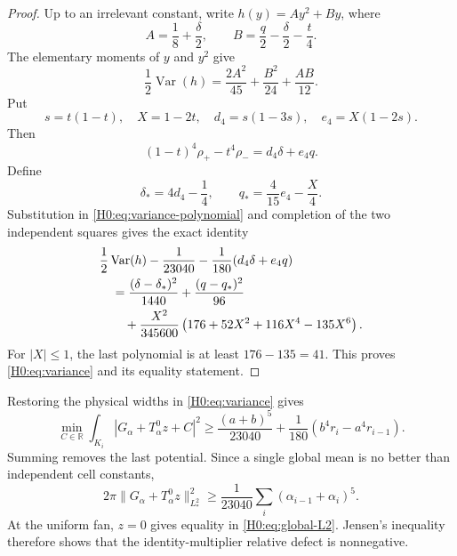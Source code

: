 \documentclass[11pt]{amsart}
\numberwithin{equation}{section}
\theoremstyle{definition}
\theoremstyle{remark}
\newcommand{\R}{\mathbb R}
\begin{document}
\begin{proof}
Up to an irrelevant constant, write $h(y)=Ay^2+By$, where
\begin{equation}
 A=\frac18+\frac\delta2,
 \qquad B=\frac q2-\frac\delta2-\frac t4.
\end{equation}
The elementary moments of $y$ and $y^2$ give
\begin{equation}\label{H0:eq:variance-polynomial}
 \frac12\operatorname {Var}(h)
 =\frac{2A^2}{45}+\frac{B^2}{24}+\frac{AB}{12}.
\end{equation}
Put
\begin{equation}
 s=t(1-t),\quad X=1-2t,\quad
 d_4=s(1-3s),\quad e_4=X(1-2s).
\end{equation}
Then
\begin{equation}
 (1-t)^4\rho_+-t^4\rho_-=d_4\delta+e_4q.
\end{equation}
Define
\begin{equation}
 \delta_*=4d_4-\frac14,
 \qquad q_*=\frac4{15}e_4-\frac X4.
\end{equation}
Substitution in \eqref{H0:eq:variance-polynomial} and completion of the two
independent squares gives the exact identity
\begin{align}
 &\frac12\operatorname {Var}(h)-\frac1{23040}
 -\frac1{180}(d_4\delta+e_4q)\notag\\
 &\quad=\frac{(\delta-\delta_*)^2}{1440}
 +\frac{(q-q_*)^2}{96}\notag\\
 &\qquad+\frac{X^2}{345600}
 \left(176+52X^2+116X^4-135X^6\right).
 \label{H0:eq:variance-squares}
\end{align}
For $|X|\le1$, the last polynomial is at least
$176-135=41$.  This proves \eqref{H0:eq:variance} and its equality statement.
\end{proof}

Restoring the physical widths in \eqref{H0:eq:variance} gives
\begin{equation}\label{H0:eq:physical-variance}
 \min_{C\in\R}\int_{K_i}
 |G_\alpha+T_\alpha^0z+C|^2
 \ge\frac{(a+b)^5}{23040}
 +\frac1{180}(b^4r_i-a^4r_{i-1}).
\end{equation}
Summing removes the last potential.  Since a single global mean is no better
than independent cell constants,
\begin{equation}\label{H0:eq:global-L2}
 2\pi\|G_\alpha+T_\alpha^0z\|_{L_*^2}^2
 \ge\frac1{23040}\sum_i(\alpha_{i-1}+\alpha_i)^5.
\end{equation}
At the uniform fan, $z=0$ gives equality in \eqref{H0:eq:global-L2}.  Jensen's
inequality therefore shows that the identity-multiplier relative defect is
nonnegative.
\end{document}
